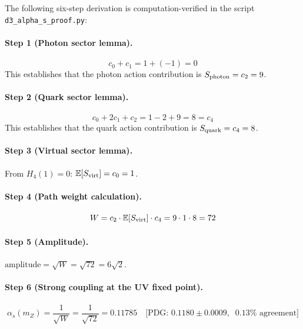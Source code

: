 \documentclass[12pt,a4paper]{article}
\begin{document}
The following six-step derivation is computation-verified in the script \texttt{d3\_alpha\_s\_proof.py}:

\paragraph{Step 1 (Photon sector lemma).}
\begin{equation}
  c_0+c_1 = 1+(-1) = 0
  \label{eq:lemma1}
\end{equation}
This establishes that the photon action contribution is $S_{\rm photon}=c_2=9$.

\paragraph{Step 2 (Quark sector lemma).}
\begin{equation}
  c_0+2c_1+c_2 = 1-2+9 = 8 = c_4
  \label{eq:lemma2}
\end{equation}
This establishes that the quark action contribution is $S_{\rm quark}=c_4=8$.

\paragraph{Step 3 (Virtual sector lemma).}
From $H_4(1)=0$: $\mathbb{E}[S_{\rm virt}]=c_0=1$.

\paragraph{Step 4 (Path weight calculation).}
\begin{equation}
  W = c_2\cdot\mathbb{E}[S_{\rm virt}]\cdot c_4 = 9\cdot1\cdot8 = 72
  \label{eq:W72}
\end{equation}

\paragraph{Step 5 (Amplitude).}
$\text{amplitude} = \sqrt{W} = \sqrt{72} = 6\sqrt{2}$.

\paragraph{Step 6 (Strong coupling at the UV fixed point).}
\begin{equation}
  \boxed{\alpha_s(m_Z) = \frac{1}{\sqrt{W}} = \frac{1}{\sqrt{72}} = 0.11785}
  \quad\text{[PDG: }0.1180\pm0.0009,\;\;0.13\%\text{ agreement]}
  \label{eq:alphas}
\end{equation}
\end{document}

